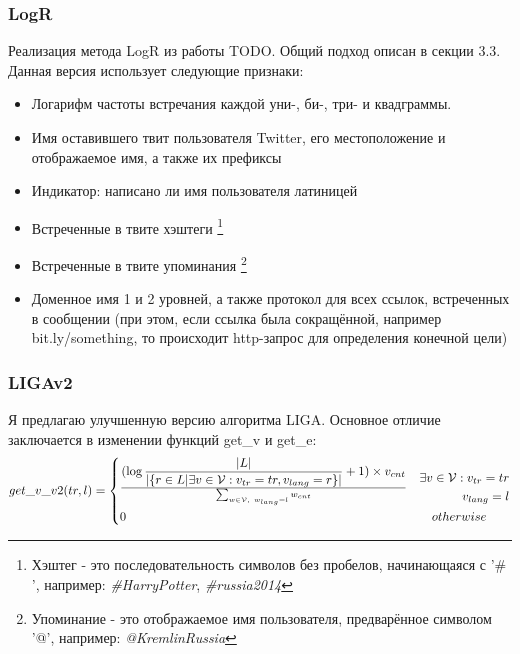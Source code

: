 \documentclass[a4paper, 14pt]{article}
\begin{document}
			\subsubsection{LogR}
			Реализация метода LogR из работы TODO. Общий подход описан в секции 3.3. Данная версия использует следующие признаки:
			\begin{itemize}
				\item Логарифм частоты встречания каждой уни-, би-, три- и квадграммы.
				\item Имя оставившего твит пользователя Twitter, его местоположение и отображаемое имя, а также их префиксы
				\item Индикатор: написано ли имя пользователя латиницей
				\item Встреченные в твите хэштеги
					\footnote{Хэштег - это последовательность символов без пробелов, начинающаяся с '$\#$', например: \textit{\#HarryPotter}, \textit{\#russia2014}}
				\item Встреченные в твите упоминания
					\footnote{Упоминание - это отображаемое имя пользователя, предварённое символом '@', например: \textit{@KremlinRussia}}
				\item Доменное имя 1 и 2 уровней, а также протокол для всех ссылок, встреченных в сообщении (при этом, если ссылка была сокращённой,
				например bit.ly/something, то происходит http-запрос для определения конечной цели)
			\end{itemize}
			\subsubsection{LIGAv2}
			Я предлагаю улучшенную версию алгоритма LIGA. Основное отличие заключается в изменении функций get\_v и get\_e:
			\[
 			get\_v\_v2(tr, l) =
 			  \begin{dcases}
  			   {(\log{|L| \over |\{r \in L | \exists v \in \mathcal{V}: v_{tr}=tr, v_{lang}=r\}|} + 1) \times  v_{cnt}} \over 
  			   \sum_{w \in \mathcal{V},\ w_{lang}=l} w_{cnt} & 
  			   \begin{split} 
						 \exists v \in \mathcal{V}: v_{tr}=tr \\ v_{lang}=l	
  			   	\end{split} \\
  			   0 & \quad otherwise
  			 \end{dcases}
			\]		
		
\end{document}
